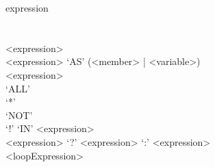 \documentclass[11pt,a4paper]{article}
\begin{document}
\begin{appendices}
\begin{gram*}
\begin{rrdiag*}{expression}
		 \\ 
		 \\ 
		 \\ 
		\est <expression> \\ %
		<expression> `AS' (<member> | <variable>) \\ %
		<expression> \sst \\ `ALL' \\ `*' \est \sst \\ `NOT' \\ `!' \est `IN' <expression> \\ %
		<expression> `?' <expression> `:' <expression> \\ %
		<loopExpression> %
		\est
	\end{rrdiag*}
\end{gram*}

\end{appendices}
\end{document}
